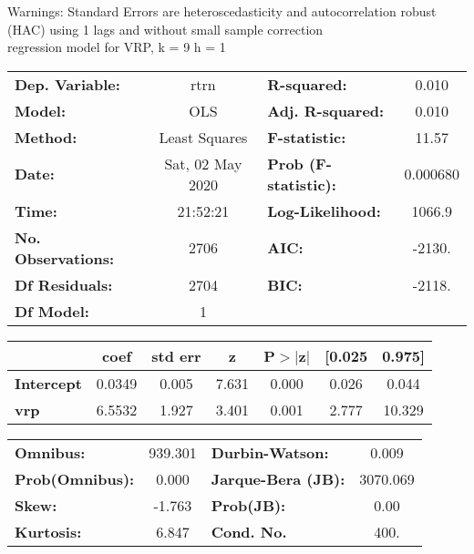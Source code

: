 Warnings: \newline
 [1] Standard Errors are heteroscedasticity and autocorrelation robust (HAC) using 1 lags and without small sample correction\\ 

regression model for VRP, k = 9 h = 1\begin{center}
\begin{tabular}{lclc}
\toprule
\textbf{Dep. Variable:}    &       rtrn       & \textbf{  R-squared:         } &     0.010   \\
\textbf{Model:}            &       OLS        & \textbf{  Adj. R-squared:    } &     0.010   \\
\textbf{Method:}           &  Least Squares   & \textbf{  F-statistic:       } &     11.57   \\
\textbf{Date:}             & Sat, 02 May 2020 & \textbf{  Prob (F-statistic):} &  0.000680   \\
\textbf{Time:}             &     21:52:21     & \textbf{  Log-Likelihood:    } &    1066.9   \\
\textbf{No. Observations:} &        2706      & \textbf{  AIC:               } &    -2130.   \\
\textbf{Df Residuals:}     &        2704      & \textbf{  BIC:               } &    -2118.   \\
\textbf{Df Model:}         &           1      & \textbf{                     } &             \\
\bottomrule
\end{tabular}
\begin{tabular}{lcccccc}
                   & \textbf{coef} & \textbf{std err} & \textbf{z} & \textbf{P$> |$z$|$} & \textbf{[0.025} & \textbf{0.975]}  \\
\midrule
\textbf{Intercept} &       0.0349  &        0.005     &     7.631  &         0.000        &        0.026    &        0.044     \\
\textbf{vrp}       &       6.5532  &        1.927     &     3.401  &         0.001        &        2.777    &       10.329     \\
\bottomrule
\end{tabular}
\begin{tabular}{lclc}
\textbf{Omnibus:}       & 939.301 & \textbf{  Durbin-Watson:     } &    0.009  \\
\textbf{Prob(Omnibus):} &   0.000 & \textbf{  Jarque-Bera (JB):  } & 3070.069  \\
\textbf{Skew:}          &  -1.763 & \textbf{  Prob(JB):          } &     0.00  \\
\textbf{Kurtosis:}      &   6.847 & \textbf{  Cond. No.          } &     400.  \\
\bottomrule
\end{tabular}
\end{center}

